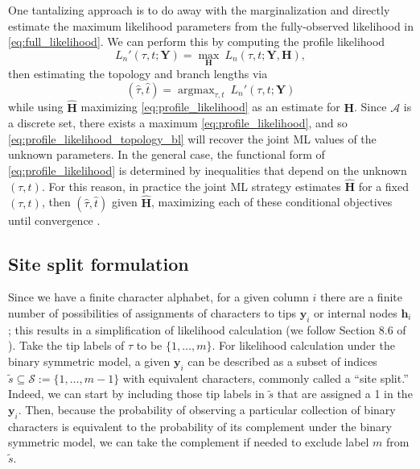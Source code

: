 \documentclass[a4paper]{article}
\newcommand{\alphabet}{\mathcal{A}}
\newcommand{\fullAlignment}{\mathbf{Y}}
\newcommand{\alignmentColumn}{\mathbf{y}}
\newcommand{\siteSplit}{\tilde{s}}
\newcommand{\siteSplitSet}{\mathcal{S}}
\newcommand{\fullAncestralStates}{\mathbf{H}}
\newcommand{\ancestralStateColumn}{\mathbf{h}}
\newcommand{\nCols}{n}
\newcommand{\nSiteRows}{m}
\DeclareMathOperator*{\argmax}{argmax}
\begin{document}
One tantalizing approach is to do away with the marginalization and directly estimate the maximum likelihood parameters from the fully-observed likelihood in \eqref{eq:full_likelihood}.
We can perform this by computing the profile likelihood
\begin{equation}
\label{eq:profile_likelihood}
L_\nCols'(\tau, t; \fullAlignment) = \max_{\fullAncestralStates} \ L_\nCols(\tau, t; \fullAlignment, \fullAncestralStates),
\end{equation}
then estimating the topology and branch lengths via
\begin{equation}
\label{eq:profile_likelihood_topology_bl}
(\hat{\tau}, \hat{t}) = \argmax_{\tau, t} \ L_\nCols'(\tau, t; \fullAlignment)
\end{equation}
while using $\hat{\fullAncestralStates}$ maximizing \eqref{eq:profile_likelihood} as an estimate for $\fullAncestralStates$.
Since $\alphabet$ is a discrete set, there exists a maximum \eqref{eq:profile_likelihood}, and so \eqref{eq:profile_likelihood_topology_bl} will recover the joint ML values of the unknown parameters.
In the general case, the functional form of \eqref{eq:profile_likelihood} is determined by inequalities that depend on the unknown $(\tau,t)$.
For this reason, in practice the joint ML strategy estimates $\hat{\fullAncestralStates}$ for a fixed $(\tau,t)$, then $(\hat{\tau},\hat{t})$ given $\hat{\fullAncestralStates}$, maximizing each of these conditional objectives until convergence \cite{Neher2017}.

\subsection{Site split formulation}

Since we have a finite character alphabet, for a given column $i$ there are a finite number of possibilities of assignments of characters to tips $\alignmentColumn_i$ or internal nodes $\ancestralStateColumn_i$; this results in a simplification of likelihood calculation (we follow Section 8.6 of \cite{Semple2003-em}).
Take the tip labels of $\tau$ to be $\{1,\ldots,\nSiteRows\}$.
For likelihood calculation under the binary symmetric model, a given $\alignmentColumn_i$ can be described as a subset of indices $\siteSplit\subseteq\siteSplitSet:=\{1,\ldots,\nSiteRows-1\}$ with equivalent characters, commonly called a ``site split.''
Indeed, we can start by including those tip labels in $\siteSplit$ that are assigned a 1 in the $\alignmentColumn_i$.
Then, because the probability of observing a particular collection of binary characters is equivalent to the probability of its complement under the binary symmetric model, we can take the complement if needed to exclude label $\nSiteRows$ from $\siteSplit$.
\end{document}
